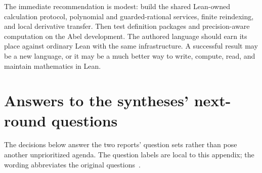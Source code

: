 \documentclass[11pt,a4paper]{article}
\theoremstyle{remark}\newtheorem{example}[proposition]{Example}
\begin{document}
The immediate recommendation is modest: build the shared Lean-owned calculation protocol, polynomial and guarded-rational services, finite reindexing, and local derivative transfer. Then test definition packages and precision-aware computation on the Abel development. The authored language should earn its place against ordinary Lean with the same infrastructure. A successful result may be a new language, or it may be a much better way to write, compute, read, and maintain mathematics in Lean.

\clearpage
\appendix
\section{Answers to the syntheses' next-round questions}\label{app:answers}
The decisions below answer the two reports' question sets rather than pose another unprioritized agenda. The question labels are local to this appendix; the wording abbreviates the original questions~\cite{synthesis,blueprints}.
\end{document}
